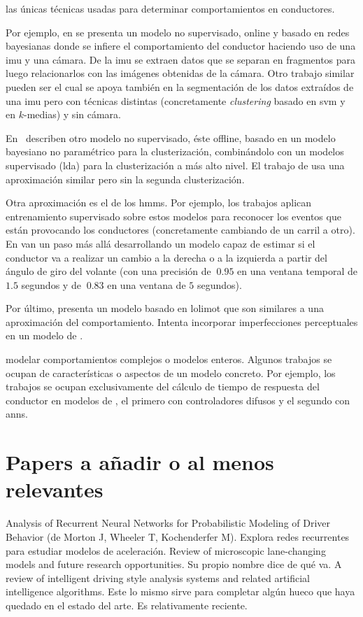 las únicas técnicas usadas para determinar comportamientos en conductores.

Por ejemplo, en \cite{maye2011bayesian} se presenta un modelo no supervisado, online y basado en redes bayesianas donde se infiere el comportamiento del conductor haciendo uso de una \gls{imu} y una cámara. De la \gls{imu} se extraen datos que se separan en fragmentos para luego relacionarlos con las imágenes obtenidas de la cámara. Otro trabajo similar pueden ser \cite{van2013driver} el cual se apoya también en la segmentación de los datos extraídos de una \gls{imu} pero con técnicas distintas (concretamente \textit{clustering} basado en \gls{svm} y en $k$-medias) y sin cámara.

En~\cite{bando2013unsupervised} describen otro modelo no supervisado, éste offline, basado en un modelo bayesiano no paramétrico para la clusterización, combinándolo con un modelos supervisado (\gls{lda}) para la clusterización a más alto nivel. El trabajo de \cite{bender2015unsupervised} usa una aproximación similar pero sin la segunda clusterización.

Otra aproximación es el de los \glspl{hmm}. Por ejemplo, los trabajos \cite{Kuge2000,sekizawa2007modeling} aplican entrenamiento supervisado sobre estos modelos para reconocer los eventos que están provocando los conductores (concretamente cambiando de un carril a otro). En \cite{Hou2011} van un paso más allá desarrollando un modelo capaz de estimar si el conductor va a realizar un cambio a la derecha o a la izquierda a partir del ángulo de giro del volante (con una precisión de $~0.95$ en una ventana temporal de $1.5$ segundos y de $~0.83$ en una ventana de $5$ segundos).

Por último, \cite{Aghabayk2013} presenta un modelo basado en \gls{lolimot} que son similares a una aproximación \textit{} del comportamiento. Intenta incorporar imperfecciones perceptuales en un modelo de \textit{}.

 modelar comportamientos complejos o modelos enteros. Algunos trabajos se ocupan de características o aspectos de un modelo concreto. Por ejemplo, los trabajos \cite{Hatipkarasulu2002, zheng2013} se ocupan exclusivamente del cálculo de tiempo de respuesta del conductor en modelos de \textit{}, el primero con controladores difusos y el segundo con \glspl{ann}.

\section{Papers a añadir o al menos relevantes}

Analysis of Recurrent Neural Networks for Probabilistic Modeling of Driver Behavior (de Morton J, Wheeler T, Kochenderfer M). Explora redes recurrentes para estudiar modelos de aceleración.
Review of microscopic lane-changing models and future research opportunities. Su propio nombre dice de qué va.
A review of intelligent driving style analysis systems and related artificial intelligence algorithms. Este lo mismo sirve para completar algún hueco que haya quedado en el estado del arte. Es relativamente reciente.

